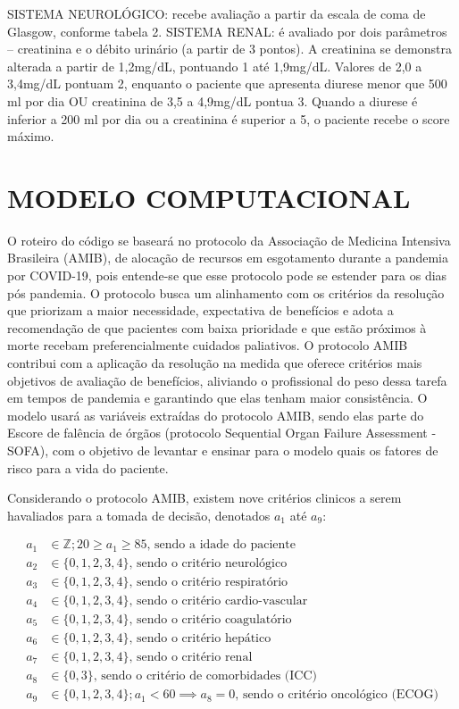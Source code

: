 \documentclass[12pt]{article}
\begin{document}
SISTEMA NEUROLÓGICO: recebe avaliação a partir da escala de coma de Glasgow, conforme tabela 2. 
SISTEMA RENAL: é avaliado por dois parâmetros – creatinina e o débito urinário (a partir de 3 pontos). A creatinina se demonstra alterada a partir de 1,2mg/dL, pontuando 1 até 1,9mg/dL. Valores de 2,0 a 3,4mg/dL pontuam 2, enquanto o paciente que apresenta diurese menor que 500 ml por dia OU creatinina de 3,5 a 4,9mg/dL pontua 3. Quando a diurese é inferior a 200 ml por dia ou a creatinina é superior a 5, o paciente recebe o score máximo. 



\section{MODELO COMPUTACIONAL}

O roteiro do código se baseará no protocolo da Associação de Medicina Intensiva Brasileira (AMIB), de alocação de recursos em esgotamento durante a pandemia por COVID-19, pois entende-se que esse protocolo pode se estender para os dias pós pandemia. O protocolo busca um alinhamento com os critérios da resolução que priorizam a maior necessidade, expectativa de benefícios e adota a recomendação de que pacientes com baixa prioridade e que estão próximos à morte recebam preferencialmente cuidados paliativos. O protocolo AMIB contribui com a aplicação da resolução na medida que oferece critérios mais objetivos de avaliação de benefícios, aliviando o profissional do peso dessa tarefa em tempos de pandemia e garantindo que elas tenham maior consistência.
O modelo usará as variáveis extraídas do protocolo AMIB, sendo elas parte do Escore de falência de órgãos (protocolo Sequential Organ Failure Assessment - SOFA), com o objetivo de levantar e ensinar para o modelo quais os fatores de risco para a vida do paciente.

Considerando o protocolo AMIB, existem nove critérios clinicos a serem havaliados para a tomada de decisão, denotados $a_1$ até $a_9$:

\[
    \begin{split}
        a_1 &\in \mathbb{Z}; 20 \ge a_1 \ge 85\text{, sendo a idade do paciente} \\
        a_2 &\in \{0, 1, 2, 3, 4\}\text{, sendo o critério neurológico} \\
        a_3 &\in \{0, 1, 2, 3, 4\}\text{, sendo o critério respiratório} \\
        a_4 &\in \{0, 1, 2, 3, 4\}\text{, sendo o critério cardio-vascular} \\
        a_5 &\in \{0, 1, 2, 3, 4\}\text{, sendo o critério coagulatório} \\
        a_6 &\in \{0, 1, 2, 3, 4\}\text{, sendo o critério hepático} \\
        a_7 &\in \{0, 1, 2, 3, 4\}\text{, sendo o critério renal} \\
        a_8 &\in \{0, 3\}\text{, sendo o critério de comorbidades (ICC)} \\
        a_9 &\in \{0, 1, 2, 3, 4\}; a_1 < 60 \implies a_8=0\text{, sendo o critério oncológico (ECOG)} \\
    \end{split}
\] 
\end{document}
